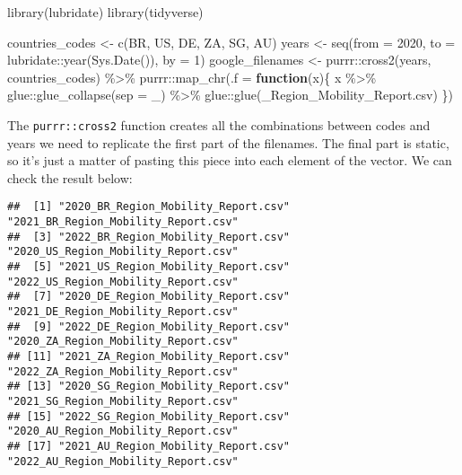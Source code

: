 \documentclass[
]{book}
\newenvironment{Shaded}{\begin{snugshade}}{\end{snugshade}}
\newcommand{\AttributeTok}[1]{\textcolor[rgb]{0.77,0.63,0.00}{#1}}
\newcommand{\ControlFlowTok}[1]{\textcolor[rgb]{0.13,0.29,0.53}{\textbf{#1}}}
\newcommand{\DecValTok}[1]{\textcolor[rgb]{0.00,0.00,0.81}{#1}}
\newcommand{\FunctionTok}[1]{\textcolor[rgb]{0.00,0.00,0.00}{#1}}
\newcommand{\NormalTok}[1]{#1}
\newcommand{\OtherTok}[1]{\textcolor[rgb]{0.56,0.35,0.01}{#1}}
\newcommand{\SpecialCharTok}[1]{\textcolor[rgb]{0.00,0.00,0.00}{#1}}
\newcommand{\StringTok}[1]{\textcolor[rgb]{0.31,0.60,0.02}{#1}}
\begin{document}
\begin{Shaded}
\begin{Highlighting}[]
\FunctionTok{library}\NormalTok{(lubridate)}
\FunctionTok{library}\NormalTok{(tidyverse)}

\NormalTok{countries\_codes  }\OtherTok{\textless{}{-}} \FunctionTok{c}\NormalTok{(}\StringTok{\textquotesingle{}BR\textquotesingle{}}\NormalTok{, }\StringTok{\textquotesingle{}US\textquotesingle{}}\NormalTok{, }\StringTok{\textquotesingle{}DE\textquotesingle{}}\NormalTok{, }\StringTok{\textquotesingle{}ZA\textquotesingle{}}\NormalTok{, }\StringTok{\textquotesingle{}SG\textquotesingle{}}\NormalTok{, }\StringTok{\textquotesingle{}AU\textquotesingle{}}\NormalTok{)}
\NormalTok{years            }\OtherTok{\textless{}{-}} \FunctionTok{seq}\NormalTok{(}\AttributeTok{from =} \DecValTok{2020}\NormalTok{, }
                        \AttributeTok{to =}\NormalTok{ lubridate}\SpecialCharTok{::}\FunctionTok{year}\NormalTok{(}\FunctionTok{Sys.Date}\NormalTok{()), }
                        \AttributeTok{by =} \DecValTok{1}\NormalTok{)}
\NormalTok{google\_filenames }\OtherTok{\textless{}{-}} 
\NormalTok{  purrr}\SpecialCharTok{::}\FunctionTok{cross2}\NormalTok{(years, countries\_codes) }\SpecialCharTok{\%\textgreater{}\%} 
\NormalTok{  purrr}\SpecialCharTok{::}\FunctionTok{map\_chr}\NormalTok{(}\AttributeTok{.f =} \ControlFlowTok{function}\NormalTok{(x)\{}
\NormalTok{    x }\SpecialCharTok{\%\textgreater{}\%} 
\NormalTok{      glue}\SpecialCharTok{::}\FunctionTok{glue\_collapse}\NormalTok{(}\AttributeTok{sep =} \StringTok{\textquotesingle{}\_\textquotesingle{}}\NormalTok{) }\SpecialCharTok{\%\textgreater{}\%}
\NormalTok{      glue}\SpecialCharTok{::}\FunctionTok{glue}\NormalTok{(}\StringTok{\textquotesingle{}\_Region\_Mobility\_Report.csv\textquotesingle{}}\NormalTok{)}
\NormalTok{  \})}
\end{Highlighting}
\end{Shaded}

The \texttt{purrr::cross2} function creates all the combinations between codes and years we need to replicate the first part of the filenames. The final part is static, so it's just a matter of pasting this piece into each element of the vector. We can check the result below:

\begin{verbatim}
##  [1] "2020_BR_Region_Mobility_Report.csv" "2021_BR_Region_Mobility_Report.csv"
##  [3] "2022_BR_Region_Mobility_Report.csv" "2020_US_Region_Mobility_Report.csv"
##  [5] "2021_US_Region_Mobility_Report.csv" "2022_US_Region_Mobility_Report.csv"
##  [7] "2020_DE_Region_Mobility_Report.csv" "2021_DE_Region_Mobility_Report.csv"
##  [9] "2022_DE_Region_Mobility_Report.csv" "2020_ZA_Region_Mobility_Report.csv"
## [11] "2021_ZA_Region_Mobility_Report.csv" "2022_ZA_Region_Mobility_Report.csv"
## [13] "2020_SG_Region_Mobility_Report.csv" "2021_SG_Region_Mobility_Report.csv"
## [15] "2022_SG_Region_Mobility_Report.csv" "2020_AU_Region_Mobility_Report.csv"
## [17] "2021_AU_Region_Mobility_Report.csv" "2022_AU_Region_Mobility_Report.csv"
\end{verbatim}
\end{document}
